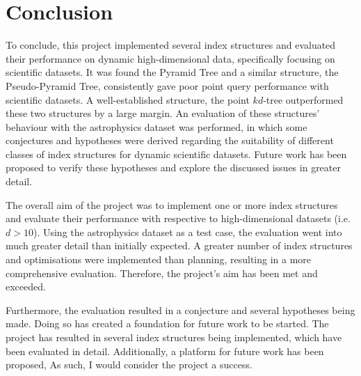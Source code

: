 \section{Conclusion}

To conclude, this project implemented several index structures and evaluated their performance on dynamic high-dimensional data, specifically focusing on scientific datasets. It was found the Pyramid Tree and a similar structure, the Pseudo-Pyramid Tree, consistently gave poor point query performance with scientific datasets. A well-established structure, the point $kd$-tree outperformed these two structures by a large margin. An evaluation of these structures' behaviour with the astrophysics dataset was performed, in which some conjectures and hypotheses were derived regarding the suitability of different classes of index structures for dynamic scientific datasets. Future work has been proposed to verify these hypotheses and explore the discussed issues in greater detail.

The overall aim of the project was to implement one or more index structures and evaluate their performance with respective to high-dimensional datasets (i.e. $d > 10$). Using the astrophysics dataset as a test case, the evaluation went into much greater detail than initially expected. A greater number of index structures and optimisations were implemented than planning, resulting in a more comprehensive evaluation. Therefore, the project's aim has been met and exceeded.

Furthermore, the evaluation resulted in a conjecture and several hypotheses being made. Doing so has created a foundation for future work to be started. The project has resulted in several index structures being implemented, which have been evaluated in detail. Additionally, a platform for future work has been proposed, As such, I would consider the project a success.